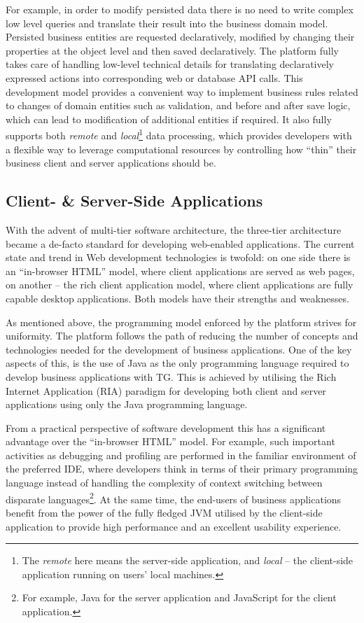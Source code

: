   For example, in order to modify persisted data there is no need to write complex low level queries and translate their result into the business domain model.
  Persisted business entities are requested declaratively, modified by changing their properties at the object level and then saved declaratively.
  The platform fully takes care of handling low-level technical details for translating declaratively expressed actions into corresponding web or database API calls.
  This development model provides a convenient way to implement business rules related to changes of domain entities such as validation, and before and after save logic, which can lead to modification of additional entities if required.
  It also fully supports both \emph{remote} and \emph{local}\footnote{The \emph{remote} here means the server-side application, and \emph{local} -- the client-side application running on users' local machines.} data processing, which provides developers with a flexible way to leverage computational resources by controlling how ``thin'' their business client and server applications should be.

  \subsection{Client- \& Server-Side Applications}
  With the advent of multi-tier software architecture, the three-tier architecture became a de-facto standard for developing web-enabled applications.
  The current state and trend in Web development technologies is twofold: on one side there is an ``in-browser HTML'' model, where client applications are served as web pages, on another -- the rich client application model, where client applications are fully capable desktop applications.
  Both models have their strengths and weaknesses.

  As mentioned above, the programming model enforced by the platform strives for uniformity. 
  The platform follows the path of reducing the number of concepts and technologies needed for the development of business applications.
  One of the key aspects of this, is the use of Java as the only programming language required to develop business applications with TG.
  This is achieved by utilising the Rich Internet Application (RIA) paradigm for developing both client and server applications using only the Java programming language.
  
  From a practical perspective of software development this has a significant advantage over the ``in-browser HTML'' model.  
  For example, such important activities as debugging and profiling are performed in the familiar environment of the preferred IDE, where developers think in terms of their primary programming language instead of handling the complexity of context switching between disparate languages\footnote{For example, Java for the server application and JavaScript for the client application.}.
  At the same time, the end-users of business applications benefit from the power of the fully fledged JVM utilised by the client-side application to provide high performance and an excellent usability experience.
  
